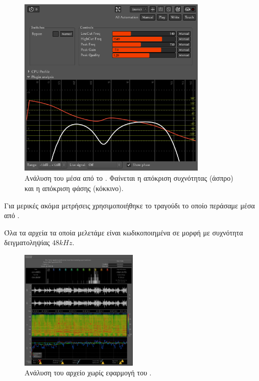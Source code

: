 \documentclass{article}
\begin{document}
\begin{figure}[htpb]
    \centering
    \includegraphics[width=0.8\textwidth]{./assets/PluginAnalysisArdour.png}
    \caption{Ανάλυση του  μέσα από το . Φαίνεται η απόκριση συχνότητας (άσπρο) και η απόκριση φάσης (κόκκινο).}
    \label{fig:ardour_analysis}
\end{figure}

Για μερικές ακόμα μετρήσεις χρησιμοποιήθηκε το τραγούδι  
το οποίο περάσαμε μέσα από . 

Όλα τα αρχεία τα οποία μελετάμε είναι κωδικοποιημένα σε μορφή  με συχνότητα δειγματοληψίας $48kHz$.

\begin{figure}[htpb]
    \centering
    \includegraphics[width=0.5\textwidth]{./assets/session.png}
    \caption{Ανάλυση του αρχείο  χωρίς εφαρμογή του .}
    \label{fig:sessionanalysis}
\end{figure}
\end{document}
